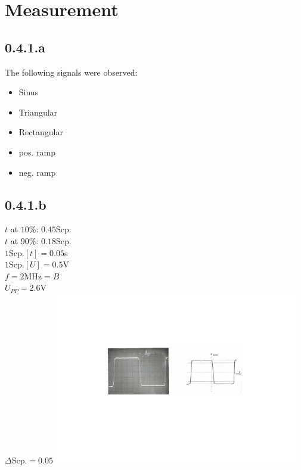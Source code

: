 \section{Measurement}
\subsection{0.4.1.a}
The following signals were observed:
\begin{itemize}
	\item{Sinus}
	\item{Triangular}
	\item{Rectangular}
	\item{pos. ramp}
	\item{neg. ramp}
\end{itemize}
\subsection{0.4.1.b}
\centering
$t$ at $10\%$: $0.45$Scp.\\
$t$ at $90\%$: $0.18$Scp.\\
$1$Scp.$[t]=0.05$s\\
$1$Scp.$[U]=0.5$V\\
$f=2$MHz$=B$\\
$U_{PP}=2.6$V\\
$\Delta$Scp.$=0.05$
\includegraphics[width=0.8\textwidth]{vorversuch}
